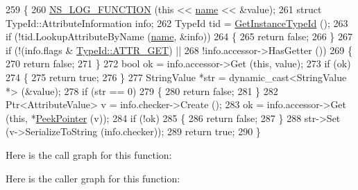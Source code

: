 \begin{DoxyCode}
259 \{
260   \hyperlink{log-macros-disabled_8h_a90b90d5bad1f39cb1b64923ea94c0761}{NS\_LOG\_FUNCTION} (\textcolor{keyword}{this} << \hyperlink{generate__test__data__lte__spectrum__model_8m_ab74e6bf80237ddc4109968cedc58c151}{name} << &value);
261   \textcolor{keyword}{struct }TypeId::AttributeInformation info;
262   TypeId tid = \hyperlink{classns3_1_1ObjectBase_abe5b43a6f5b99a92a4c3122db31f06fb}{GetInstanceTypeId} ();
263   \textcolor{keywordflow}{if} (!tid.LookupAttributeByName (\hyperlink{generate__test__data__lte__spectrum__model_8m_ab74e6bf80237ddc4109968cedc58c151}{name}, &info))
264     \{
265       \textcolor{keywordflow}{return} \textcolor{keyword}{false};
266     \}
267   \textcolor{keywordflow}{if} (!(info.flags & \hyperlink{classns3_1_1TypeId_a3ab7b43b95f96391c514d609ca60e542a3dd4b476c9b257285c177d6c414b5fd0}{TypeId::ATTR\_GET}) ||
268       !info.accessor->HasGetter ())
269     \{
270       \textcolor{keywordflow}{return} \textcolor{keyword}{false};
271     \}
272   \textcolor{keywordtype}{bool} ok = info.accessor->Get (\textcolor{keyword}{this}, value);
273   \textcolor{keywordflow}{if} (ok)
274     \{
275       \textcolor{keywordflow}{return} \textcolor{keyword}{true};
276     \}
277   StringValue *str = \textcolor{keyword}{dynamic\_cast<}StringValue *\textcolor{keyword}{>} (&value);
278   \textcolor{keywordflow}{if} (str == 0)
279     \{
280       \textcolor{keywordflow}{return} \textcolor{keyword}{false};
281     \}
282   Ptr<AttributeValue> v = info.checker->Create ();
283   ok = info.accessor->Get (\textcolor{keyword}{this}, *\hyperlink{namespacens3_af2a7557fe9afdd98d8f6f8f6e412cf5a}{PeekPointer} (v));
284   \textcolor{keywordflow}{if} (!ok)
285     \{
286       \textcolor{keywordflow}{return} \textcolor{keyword}{false};
287     \}
288   str->Set (v->SerializeToString (info.checker));
289   \textcolor{keywordflow}{return} \textcolor{keyword}{true};
290 \}
\end{DoxyCode}


Here is the call graph for this function\+:




Here is the caller graph for this function\+:


